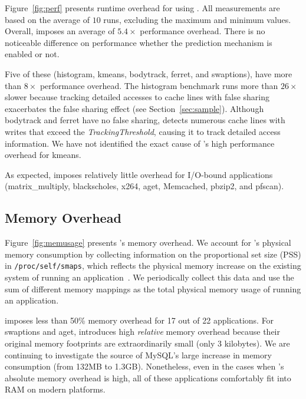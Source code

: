 Figure~\ref{fig:perf} presents runtime overhead for using \Predator{}. All 
measurements are based on the average of $10$ runs, excluding the maximum and minimum values. Overall, \Predator{} imposes an average of $5.4\times$ performance overhead. There is no noticeable difference on performance whether the prediction mechanism is enabled or not. 
 
Five of these (histogram, kmeans, bodytrack, ferret, and swaptions), have more than $8\times$ performance overhead. The histogram benchmark runs more than $26\times$ slower because tracking detailed accesses to cache lines with false sharing exacerbates the false sharing effect (see Section~\ref{sec:sample}). Although bodytrack and ferret have no false sharing, \Predator{} detects numerous cache lines with writes that exceed the {\it TrackingThreshold}, causing it to track detailed access information. We have not identified the exact cause of \Predator{}'s high performance overhead for kmeans.
   
As expected, \Predator{} imposes relatively little overhead for I/O-bound applications (matrix\_multiply, blackscholes, x264, aget, Memcached, pbzip2, and pfscan).

\subsection{Memory Overhead}
\label{sec:memoverhead}

Figure~\ref{fig:memusage} presents \Predator{}'s memory overhead. We account for \Predator{}'s physical memory consumption by collecting information on the proportional set size (PSS) in \texttt{/proc/self/smaps}, which reflects the physical memory increase on the existing system of running an application~\cite{memusage}. We periodically collect this data and use the sum of different memory mappings as the total physical memory usage of running an application.

\Predator{} imposes less than 50\% memory overhead for 17 out of 22 applications.  For swaptions and aget, \Predator{} introduces high \emph{relative} memory overhead because their original memory footprints are extraordinarily small (only $3$ kilobytes). We are continuing to investigate the source of MySQL's large increase in memory consumption (from 132MB to 1.3GB). Nonetheless, even in the cases when \Predator{}'s absolute memory overhead is high, all of these applications comfortably fit into RAM on modern platforms.

